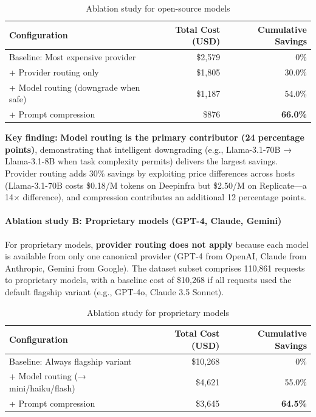 \documentclass[english]{article}
\begin{document}
\begin{table}[H]
\centering
\caption{Ablation study for open-source models}
\begin{tabular}{|l|r|r|}
\hline
\textbf{Configuration} & \textbf{Total Cost (USD)} & \textbf{Cumulative Savings} \\
\hline
Baseline: Most expensive provider & \$2,579 & 0\% \\
\hline
+ Provider routing only & \$1,805 & 30.0\% \\
\hline
+ Model routing (downgrade when safe) & \$1,187 & 54.0\% \\
\hline
+ Prompt compression & \$876 & \textbf{66.0\%} \\
\hline
\end{tabular}
\end{table}

\medskip

\noindent\textbf{Key finding:} \textbf{Model routing is the primary contributor (24 percentage points)}, demonstrating that intelligent downgrading (e.g., Llama-3.1-70B → Llama-3.1-8B when task complexity permits) delivers the largest savings. Provider routing adds 30\% savings by exploiting price differences across hosts (Llama-3.1-70B costs \$0.18/M tokens on Deepinfra but \$2.50/M on Replicate—a 14× difference), and compression contributes an additional 12 percentage points.

\paragraph{Ablation study B: Proprietary models (GPT-4, Claude, Gemini)}

For proprietary models, \textbf{provider routing does not apply} because each model is available from only one canonical provider (GPT-4 from OpenAI, Claude from Anthropic, Gemini from Google). The dataset subset comprises 110,861 requests to proprietary models, with a baseline cost of \$10,268 if all requests used the default flagship variant (e.g., GPT-4o, Claude 3.5 Sonnet).

\begin{table}[H]
\centering
\caption{Ablation study for proprietary models}
\begin{tabular}{|l|r|r|}
\hline
\textbf{Configuration} & \textbf{Total Cost (USD)} & \textbf{Cumulative Savings} \\
\hline
Baseline: Always flagship variant & \$10,268 & 0\% \\
\hline
+ Model routing (→ mini/haiku/flash) & \$4,621 & 55.0\% \\
\hline
+ Prompt compression & \$3,645 & \textbf{64.5\%} \\
\hline
\end{tabular}
\end{table}
\end{document}
